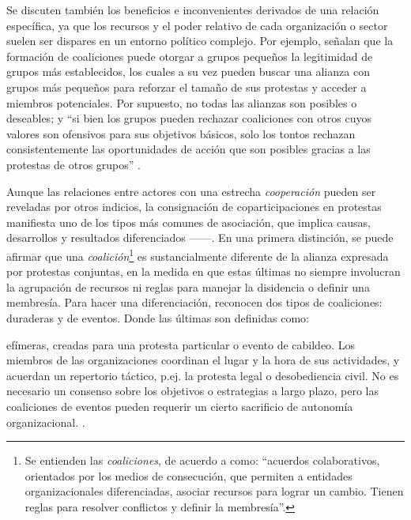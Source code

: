 \documentclass[letterpaper, 11pt]{book}
\theoremstyle{definition}
\theoremstyle{remark}
\begin{document}
Se discuten también los beneficios e inconvenientes derivados de una relación específica, ya que los recursos y el poder relativo de cada organización o sector suelen ser dispares en un entorno político complejo. 
Por ejemplo, \citet{1993_BrmanEvtt_StructureSocialProtest} señalan que la formación de coaliciones puede otorgar a grupos pequeños la legitimidad de grupos más establecidos, los cuales a su vez pueden buscar una alianza con grupos más pequeños para reforzar el tamaño de sus protestas y acceder a miembros potenciales. 
Por supuesto, no todas las alianzas son posibles o deseables; y ``si bien los grupos pueden rechazar coaliciones con otros cuyos valores son ofensivos para sus objetivos básicos, solo los tontos rechazan consistentemente las oportunidades de acción que son posibles gracias a las protestas de otros grupos'' \citep[174]{1993_BrmanEvtt_StructureSocialProtest}. 


Aunque las relaciones entre actores con una estrecha \emph{cooperación} pueden ser reveladas por otros indicios, la consignación de coparticipaciones en protestas manifiesta uno de los tipos más comunes de asociación, que implica causas, desarrollos y resultados diferenciados ---\citet{2012_Wand_andSoule_ColabiracionOMS}---. 
En una primera distinción, se puede afirmar que una \emph{coalición}\footnote{
    Se entienden las \emph{coaliciones}, de acuerdo a \citet{2006_LevyMurphy_coparticipacion} como: ``acuerdos colaborativos, orientados por los medios de consecución, que permiten a entidades organizacionales diferenciadas, asociar recursos para lograr un cambio. 
    Tienen reglas para resolver conflictos y definir la membresía''.
} 
es sustancialmente diferente de la alianza expresada por protestas conjuntas, en la medida en que estas últimas no siempre involucran la agrupación de recursos ni reglas para manejar la disidencia o definir una membresía. 
Para hacer una diferenciación, \citet{2006_LevyMurphy_coparticipacion} reconocen dos tipos de coaliciones: duraderas y de eventos. 
Donde las últimas son definidas como: 

\begin{center}
    \begin{minipage}{0.9\linewidth}
        {\setlength{\parindent}{12pt}\small
        efímeras, creadas para una protesta particular o evento de cabildeo. 
        Los miembros de las organizaciones coordinan el lugar y la hora de sus actividades, y acuerdan un repertorio táctico, p.ej. la protesta legal o desobediencia civil. 
        No es necesario un consenso sobre los objetivos o estrategias a largo plazo, pero las coaliciones de eventos pueden requerir un cierto sacrificio de autonomía organizacional. 
        \normalsize \citep[655]{2006_LevyMurphy_coparticipacion}.
        }
    \end{minipage}
\end{center}
\end{document}
